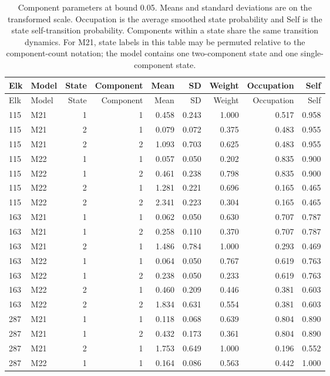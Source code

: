 \begin{longtable}{llrrrrrrr}
\caption{Component parameters at bound 0.05. Means and standard deviations are on the transformed scale. Occupation is the average smoothed state probability and Self is the state self-transition probability. Components within a state share the same transition dynamics. For M21, state labels in this table may be permuted relative to the component-count notation; the model contains one two-component state and one single-component state.}\label{tab:si-parameters}\\
\toprule
Elk & Model & State & Component & Mean & SD & Weight & Occupation & Self \\\midrule\endfirsthead
\toprule
Elk & Model & State & Component & Mean & SD & Weight & Occupation & Self \\\midrule\endhead
115 & M21 & 1 & 1 & 0.458 & 0.243 & 1.000 & 0.517 & 0.958 \\
115 & M21 & 2 & 1 & 0.079 & 0.072 & 0.375 & 0.483 & 0.955 \\
115 & M21 & 2 & 2 & 1.093 & 0.703 & 0.625 & 0.483 & 0.955 \\
115 & M22 & 1 & 1 & 0.057 & 0.050 & 0.202 & 0.835 & 0.900 \\
115 & M22 & 1 & 2 & 0.461 & 0.238 & 0.798 & 0.835 & 0.900 \\
115 & M22 & 2 & 1 & 1.281 & 0.221 & 0.696 & 0.165 & 0.465 \\
115 & M22 & 2 & 2 & 2.341 & 0.223 & 0.304 & 0.165 & 0.465 \\
163 & M21 & 1 & 1 & 0.062 & 0.050 & 0.630 & 0.707 & 0.787 \\
163 & M21 & 1 & 2 & 0.258 & 0.110 & 0.370 & 0.707 & 0.787 \\
163 & M21 & 2 & 1 & 1.486 & 0.784 & 1.000 & 0.293 & 0.469 \\
163 & M22 & 1 & 1 & 0.064 & 0.050 & 0.767 & 0.619 & 0.763 \\
163 & M22 & 1 & 2 & 0.238 & 0.050 & 0.233 & 0.619 & 0.763 \\
163 & M22 & 2 & 1 & 0.460 & 0.209 & 0.446 & 0.381 & 0.603 \\
163 & M22 & 2 & 2 & 1.834 & 0.631 & 0.554 & 0.381 & 0.603 \\
287 & M21 & 1 & 1 & 0.118 & 0.068 & 0.639 & 0.804 & 0.890 \\
287 & M21 & 1 & 2 & 0.432 & 0.173 & 0.361 & 0.804 & 0.890 \\
287 & M21 & 2 & 1 & 1.753 & 0.649 & 1.000 & 0.196 & 0.552 \\
287 & M22 & 1 & 1 & 0.164 & 0.086 & 0.563 & 0.442 & 1.000 \\

\end{longtable}
